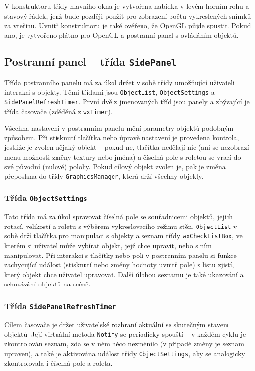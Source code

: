 \documentclass[a4paper, 12pt]{report}
\begin{document}
V konstruktoru třídy hlavního okna je vytvořena nabídka v levém horním rohu a stavový řádek, jenž bude později použit pro zobrazení počtu vykreslených snímků za vteřinu. Uvnitř konstruktoru je také ověřeno, že OpenGL půjde spustit. Pokud ano, je vytvořeno plátno pro OpenGL a postranní panel s ovládáním objektů.

\subsection{Postranní panel -- třída \texttt{SidePanel}}
Třída postranního panelu má za úkol držet v sobě třídy umožňující uživateli interakci s objekty. Těmi třídami jsou \texttt{ObjectList}, \texttt{ObjectSettings} a \texttt{SidePanelRefreshTimer}. První dvě z jmenovaných tříd jsou panely a zbývající je třída časovače (zděděná z \texttt{wxTimer}).

Všechna nastavení v postranním panelu mění parametry objektů podobným způsobem. Při stisknutí tlačítka nebo úpravě nastavení je provedena kontrola, jestliže je zvolen nějaký objekt -- pokud ne, tlačítka nedělají nic (ani se nezobrazí menu možnosti změny textury nebo jména) a číselná pole s roletou se vrací do své původní (nulové) polohy. Pokud cílový objekt zvolen je, pak je změna přeposlána do třídy \texttt{GraphicsManager}, která drží všechny objekty.

\subsubsection{Třída \texttt{ObjectSettings}}
Tato třída má za úkol spravovat číselná pole se souřadnicemi objektů, jejich rotací, velikostí a roletu s výběrem vykreslovacího režimu stěn. \texttt{ObjectList} v sobě drží tlačítka pro manipulaci s objekty a seznam třídy \texttt{wxCheckListBox}, ve kterém si uživatel může vybírat objekt, jejž chce upravit, nebo s ním manipulovat. Při interakci s tlačítky nebo poli v postranním panelu si funkce zachycující událost (stisknutí nebo změny hodnoty uvnitř pole) z listu zjistí, který objekt chce uživatel upravovat. Další úlohou seznamu je také ukazování a schovávání objektů na scéně.

\subsubsection{Třída \texttt{SidePanelRefreshTimer}}
Cílem časovače je držet uživatelské rozhraní aktuální se skutečným stavem objektů. Její virtuální metoda \texttt{Notify} se periodicky spouští -- v každém cyklu je zkontrolován seznam, zda se v něm něco nezměnilo (v případě změny je seznam upraven), a také je aktivována událost třídy \texttt{ObjectSettings}, aby se analogicky zkontrolovala i číselná pole a roleta.
\end{document}
